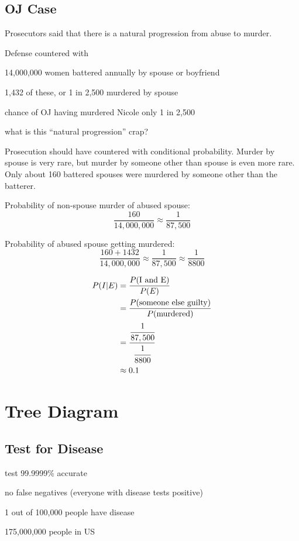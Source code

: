 \documentclass[landscape]{exam}
\begin{document}
  \subsection{OJ Case}
  Prosecutors said that there is a natural progression from abuse to murder.

  Defense countered with 
  \begin{itemize*}
    \item 14,000,000 women battered annually by spouse or boyfriend
    \item 1,432 of these, or 1 in 2,500 murdered by spouse
    \item chance of OJ having murdered Nicole only 1 in 2,500
    \item what is this ``natural progression'' crap?
  \end{itemize*}

  Prosecution should have countered with conditional probability. Murder by
  spouse is very rare, but murder by someone other than spouse is even more
  rare. Only about 160 battered spouses were murdered by someone other than
  the batterer.

  Probability of non-spouse murder of abused spouse:
  \[
    \frac{160}{14,000,000} \approx \frac{1}{87,500}
  \]

  Probability of abused spouse getting murdered:
  \[
    \frac{160 + 1432}{14,000,000} \approx \frac{1}{87,500} 
      \approx \frac{1}{8800}
  \]

  \begin{align*}
    P(I | E) & = \frac{P(\text{I and E})}{P(E)} \\
             & = \frac{P(\text{someone else guilty})}{P(\text{murdered})} \\
             & = \frac{\cfrac{1}{87,500}}{\cfrac{1}{8800}} \\
             & \approx 0.1 \\
  \end{align*}

  \section{Tree Diagram}

  \subsection{Test for Disease}

  \begin{itemize*}
    \item test 99.9999\% accurate
    \item no false negatives (everyone with disease tests positive)
    \item 1 out of 100,000 people have disease
    \item 175,000,000 people in US
  \end{itemize*}
\end{document}

